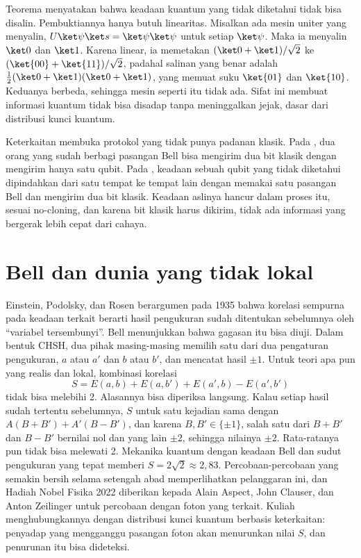 Teorema  menyatakan bahwa keadaan kuantum yang tidak diketahui tidak bisa disalin. Pembuktiannya hanya butuh
linearitas. Misalkan ada mesin uniter yang menyalin, $U\ket\psi\ket s=\ket\psi\ket\psi$ untuk setiap $\ket\psi$. Maka ia menyalin $\ket0$
dan $\ket1$. Karena linear, ia memetakan $(\ket0+\ket1)/\sqrt2$ ke $(\ket{00}+\ket{11})/\sqrt2$, padahal salinan yang benar adalah
$\tfrac12(\ket0+\ket1)(\ket0+\ket1)$, yang memuat suku $\ket{01}$ dan $\ket{10}$. Keduanya berbeda, sehingga mesin seperti itu tidak ada.
Sifat ini membuat informasi kuantum tidak bisa disadap tanpa meninggalkan jejak, dasar dari distribusi kunci kuantum.

Keterkaitan membuka protokol yang tidak punya padanan klasik. Pada , dua orang yang sudah berbagi pasangan
Bell bisa mengirim dua bit klasik dengan mengirim hanya satu qubit. Pada , keadaan sebuah qubit yang tidak
diketahui dipindahkan dari satu tempat ke tempat lain dengan memakai satu pasangan Bell dan mengirim dua bit klasik. Keadaan aslinya
hancur dalam proses itu, sesuai no-cloning, dan karena bit klasik harus dikirim, tidak ada informasi yang bergerak lebih cepat dari
cahaya.

\section{Bell dan dunia yang tidak lokal}

Einstein, Podolsky, dan Rosen berargumen pada 1935 bahwa korelasi sempurna pada keadaan terkait berarti hasil pengukuran sudah
ditentukan sebelumnya oleh ``variabel tersembunyi''. Bell menunjukkan bahwa gagasan itu bisa diuji. Dalam bentuk CHSH, dua pihak
masing-masing memilih satu dari dua pengaturan pengukuran, $a$ atau $a'$ dan $b$ atau $b'$, dan mencatat hasil $\pm1$. Untuk teori
apa pun yang realis dan lokal, kombinasi korelasi
\begin{equation}
S=E(a,b)+E(a,b')+E(a',b)-E(a',b')
\end{equation}
tidak bisa melebihi 2. Alasannya bisa diperiksa langsung. Kalau setiap hasil sudah tertentu sebelumnya, $S$ untuk satu kejadian
sama dengan $A(B+B')+A'(B-B')$, dan karena $B,B'\in\{\pm1\}$, salah satu dari $B+B'$ dan $B-B'$ bernilai nol dan yang lain $\pm2$,
sehingga nilainya $\pm2$. Rata-ratanya pun tidak bisa melewati 2. Mekanika kuantum dengan keadaan Bell dan sudut pengukuran yang
tepat memberi $S=2\sqrt2\approx2{,}83$. Percobaan-percobaan yang semakin bersih selama setengah abad memperlihatkan pelanggaran ini,
dan Hadiah Nobel Fisika 2022 diberikan kepada Alain Aspect, John Clauser, dan Anton Zeilinger untuk percobaan dengan foton yang
terkait. Kuliah menghubungkannya dengan distribusi kunci kuantum berbasis keterkaitan: penyadap yang mengganggu pasangan foton akan
menurunkan nilai $S$, dan penurunan itu bisa dideteksi.

